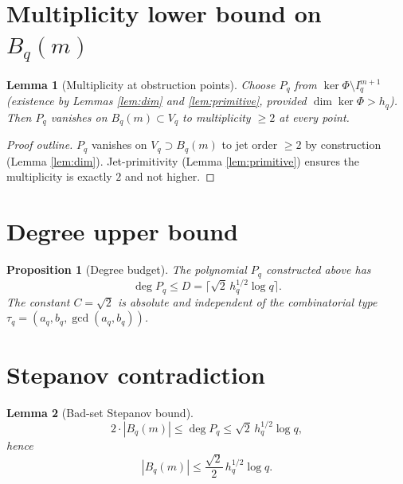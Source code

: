 \documentclass[12pt]{amsart}
\newtheorem{lemma}{Lemma}
\newtheorem{proposition}{Proposition}
\theoremstyle{definition}
\theoremstyle{remark}
\begin{document}
\section{Multiplicity lower bound on $B_q(m)$}

\begin{lemma}[Multiplicity at obstruction points]
Choose $P_q$ from $\ker\Phi \setminus I_q^{m+1}$ (existence by
Lemmas \ref{lem:dim} and \ref{lem:primitive}, provided
$\dim \ker \Phi > h_q$). Then $P_q$ vanishes on $B_q(m) \subset V_q$
to multiplicity $\ge 2$ at every point.
\end{lemma}

\begin{proof}[Proof outline]
$P_q$ vanishes on $V_q \supset B_q(m)$ to jet order $\ge 2$ by
construction (Lemma \ref{lem:dim}). Jet-primitivity
(Lemma \ref{lem:primitive}) ensures the multiplicity is exactly $2$
and not higher.
\qedhere
\end{proof}

\section{Degree upper bound}

\begin{proposition}[Degree budget]
The polynomial $P_q$ constructed above has
$$\deg P_q \le D = \lceil \sqrt{2}\, h_q^{1/2} \log q\rceil.$$
The constant $C = \sqrt{2}$ is absolute and independent of the
combinatorial type $\tau_q = (a_q, b_q, \gcd(a_q, b_q))$.
\end{proposition}

\section{Stepanov contradiction}

\begin{lemma}[Bad-set Stepanov bound]\label{lem:badset}
$$
2 \cdot |B_q(m)| \le \deg P_q \le \sqrt{2}\, h_q^{1/2} \log q,
$$
hence
$$
|B_q(m)| \le \frac{\sqrt{2}}{2}\, h_q^{1/2} \log q.
$$
\end{lemma}
\end{document}
